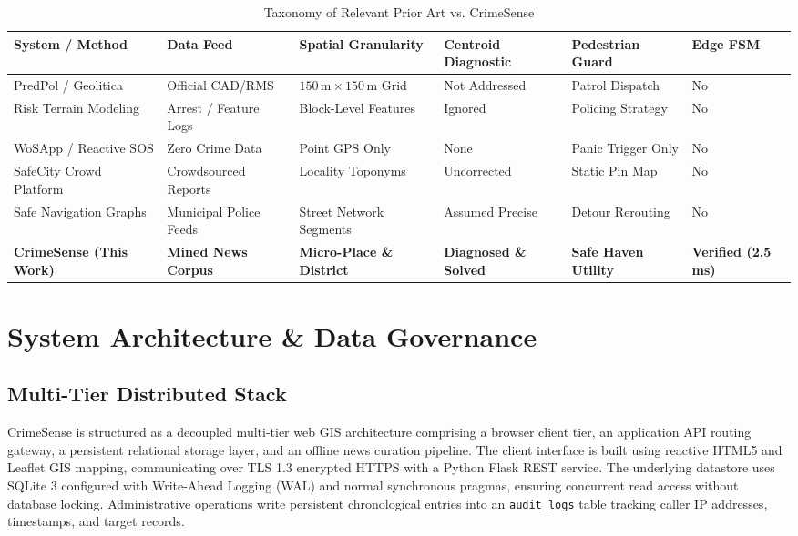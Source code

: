 \documentclass[conference]{IEEEtran}
\begin{document}
\begin{table}[t]
\centering
\caption{Taxonomy of Relevant Prior Art vs. CrimeSense}
\label{tab:taxonomy}
\begin{tabular}{llllll}
\toprule
\textbf{System / Method} & \textbf{Data Feed} & \textbf{Spatial Granularity} & \textbf{Centroid Diagnostic} & \textbf{Pedestrian Guard} & \textbf{Edge FSM} \\
\midrule
PredPol / Geolitica \cite{mohler2011self} & Official CAD/RMS & $150\,\text{m} \times 150\,\text{m}$ Grid & Not Addressed & Patrol Dispatch & No \\
Risk Terrain Modeling \cite{caplan2011risk} & Arrest / Feature Logs & Block-Level Features & Ignored & Policing Strategy & No \\
WoSApp / Reactive SOS \cite{chand2016wosapp} & Zero Crime Data & Point GPS Only & None & Panic Trigger Only & No \\
SafeCity Crowd Platform \cite{umair2020spatiotemporal} & Crowdsourced Reports & Locality Toponyms & Uncorrected & Static Pin Map & No \\
Safe Navigation Graphs \cite{galbrun2014safe} & Municipal Police Feeds & Street Network Segments & Assumed Precise & Detour Rerouting & No \\
\textbf{CrimeSense (This Work)} & \textbf{Mined News Corpus} & \textbf{Micro-Place \& District} & \textbf{Diagnosed \& Solved} & \textbf{Safe Haven Utility} & \textbf{Verified (2.5\,ms)} \\
\bottomrule
\end{tabular}
\end{table}

\section{System Architecture \& Data Governance}
\subsection{Multi-Tier Distributed Stack}
CrimeSense is structured as a decoupled multi-tier web GIS architecture comprising a browser client tier, an application API routing gateway, a persistent relational storage layer, and an offline news curation pipeline. The client interface is built using reactive HTML5 and Leaflet GIS mapping, communicating over TLS 1.3 encrypted HTTPS with a Python Flask REST service. The underlying datastore uses SQLite 3 configured with Write-Ahead Logging (WAL) and normal synchronous pragmas, ensuring concurrent read access without database locking. Administrative operations write persistent chronological entries into an \texttt{audit\_logs} table tracking caller IP addresses, timestamps, and target records.
\end{document}
